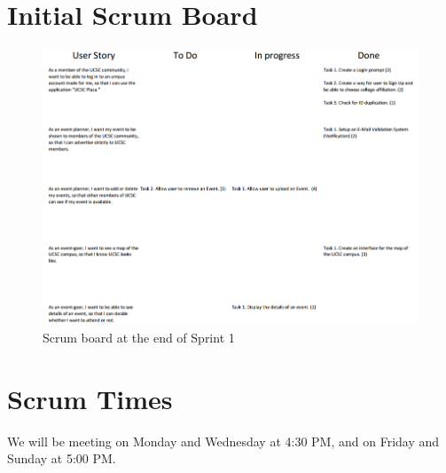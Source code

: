 \documentclass[10pt]{article}
\newcommand{\fancysecX}[2] {{\color{primary}\section*{#1} \label{sec:#2}}}
\begin{document}
\vspace{5cm}
\fancysecX{Initial Scrum Board}{scrumboard}

   \begin{figure}[!ht]
  	\caption{Scrum board at the end of Sprint 1}
  	\centering
    		\includegraphics[width=1\textwidth]{scrumboard1}
\end{figure}

\fancysecX{Scrum Times}{scrumTimes}

    We will be meeting on Monday and Wednesday at 4:30 PM, and on Friday and Sunday at 5:00 PM.
\end{document}
